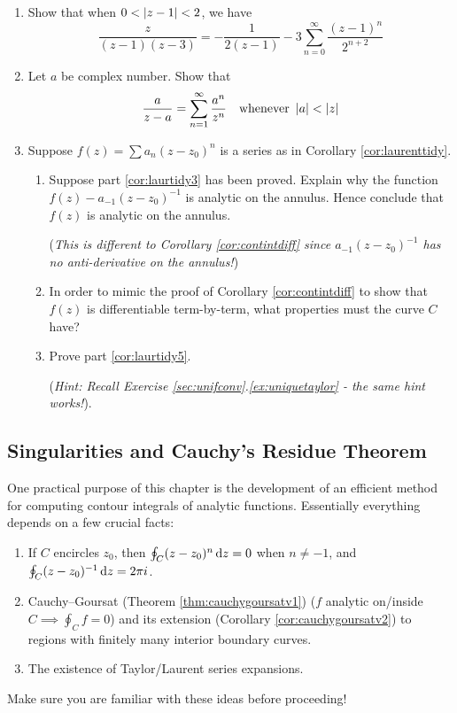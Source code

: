 \begin{exercises}
\begin{enumerate}
	
		\item Show that when $0<\left| z-1\right|<2$,  we have
		\[
			\frac z{(z-1)(z-3)}=-\frac 1{2(z-1)}-3\sum_{n=0}^\infty\frac{(z-1)^n}{2^{n+2}}
		\]
		
		
		\item Let $a$ be complex number. Show that
		\[
			\frac a{z-a}=\sum_{n=1}^\infty\frac{a^n}{z^n}
			\quad\text{whenever }
			\left| a\right|<\left| z\right|
		\]
		
		
	  \item\label{exs:laurenttidy} Suppose $f(z)=\sum a_n(z-z_0)^n$ is a series as in Corollary \ref{cor:laurenttidy}.
	  \begin{enumerate}
	    \item Suppose part \ref*{cor:laurtidy3} has been proved. Explain why the function $f(z)-a_{-1}(z-z_0)^{-1}$ is analytic on the annulus. Hence conclude that $f(z)$ is analytic on the annulus.\par
	    (\emph{This is different to Corollary \ref{cor:contintdiff} since $a_{-1}(z-z_0)^{-1}$ has no anti-derivative on the annulus!})
	    \item In order to mimic the proof of Corollary \ref{cor:contintdiff} to show that $f(z)$ is differentiable term-by-term, what properties must the curve $C$ have?
	    \item Prove part \ref*{cor:laurtidy5}.\par
	    (\emph{Hint: Recall Exercise \ref*{sec:unifconv}.\ref{ex:uniquetaylor} - the same hint works!}).
		\end{enumerate}
	\end{enumerate}
\end{exercises}


\clearpage


\subsection{Singularities and Cauchy's Residue Theorem}

One practical purpose of this chapter is the development of an efficient method for computing contour integrals of analytic functions. Essentially everything depends on a few crucial facts:
\begin{enumerate}
  \item If $C$ encircles $z_0$, then $\oint_C(z-z_0)^{n}\,{\mathrm{d} z}=0$ when $n\neq-1$, and $\oint_C(z-z_0)^{-1}\,{\mathrm{d} z}=2\pi i$.
  \item Cauchy--Goursat (Theorem \ref{thm:cauchygoursatv1}) ($f$ analytic on/inside $C\implies \oint_Cf=0$) and its extension (Corollary \ref{cor:cauchygoursatv2}) to regions with finitely many interior boundary curves.
  \item The existence of Taylor/Laurent series expansions.
\end{enumerate}
Make sure you are familiar with these ideas before proceeding!

